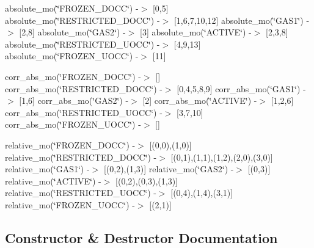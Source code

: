 absolute\+\_\+mo(\char`\"{}\+F\+R\+O\+Z\+E\+N\+\_\+\+D\+O\+C\+C\char`\"{}) -\/$>$ \mbox{[}0,5\mbox{]} absolute\+\_\+mo(\char`\"{}\+R\+E\+S\+T\+R\+I\+C\+T\+E\+D\+\_\+\+D\+O\+C\+C\char`\"{}) -\/$>$ \mbox{[}1,6,7,10,12\mbox{]} absolute\+\_\+mo(\char`\"{}\+G\+A\+S1\char`\"{}) -\/$>$ \mbox{[}2,8\mbox{]} absolute\+\_\+mo(\char`\"{}\+G\+A\+S2\char`\"{}) -\/$>$ \mbox{[}3\mbox{]} absolute\+\_\+mo(\char`\"{}\+A\+C\+T\+I\+V\+E\char`\"{}) -\/$>$ \mbox{[}2,3,8\mbox{]} absolute\+\_\+mo(\char`\"{}\+R\+E\+S\+T\+R\+I\+C\+T\+E\+D\+\_\+\+U\+O\+C\+C\char`\"{}) -\/$>$ \mbox{[}4,9,13\mbox{]} absolute\+\_\+mo(\char`\"{}\+F\+R\+O\+Z\+E\+N\+\_\+\+U\+O\+C\+C\char`\"{}) -\/$>$ \mbox{[}11\mbox{]}

corr\+\_\+abs\+\_\+mo(\char`\"{}\+F\+R\+O\+Z\+E\+N\+\_\+\+D\+O\+C\+C\char`\"{}) -\/$>$ \mbox{[}\mbox{]} corr\+\_\+abs\+\_\+mo(\char`\"{}\+R\+E\+S\+T\+R\+I\+C\+T\+E\+D\+\_\+\+D\+O\+C\+C\char`\"{}) -\/$>$ \mbox{[}0,4,5,8,9\mbox{]} corr\+\_\+abs\+\_\+mo(\char`\"{}\+G\+A\+S1\char`\"{}) -\/$>$ \mbox{[}1,6\mbox{]} corr\+\_\+abs\+\_\+mo(\char`\"{}\+G\+A\+S2\char`\"{}) -\/$>$ \mbox{[}2\mbox{]} corr\+\_\+abs\+\_\+mo(\char`\"{}\+A\+C\+T\+I\+V\+E\char`\"{}) -\/$>$ \mbox{[}1,2,6\mbox{]} corr\+\_\+abs\+\_\+mo(\char`\"{}\+R\+E\+S\+T\+R\+I\+C\+T\+E\+D\+\_\+\+U\+O\+C\+C\char`\"{}) -\/$>$ \mbox{[}3,7,10\mbox{]} corr\+\_\+abs\+\_\+mo(\char`\"{}\+F\+R\+O\+Z\+E\+N\+\_\+\+U\+O\+C\+C\char`\"{}) -\/$>$ \mbox{[}\mbox{]}

relative\+\_\+mo(\char`\"{}\+F\+R\+O\+Z\+E\+N\+\_\+\+D\+O\+C\+C\char`\"{}) -\/$>$ \mbox{[}(0,0),(1,0)\mbox{]} relative\+\_\+mo(\char`\"{}\+R\+E\+S\+T\+R\+I\+C\+T\+E\+D\+\_\+\+D\+O\+C\+C\char`\"{}) -\/$>$ \mbox{[}(0,1),(1,1),(1,2),(2,0),(3,0)\mbox{]} relative\+\_\+mo(\char`\"{}\+G\+A\+S1\char`\"{}) -\/$>$ \mbox{[}(0,2),(1,3)\mbox{]} relative\+\_\+mo(\char`\"{}\+G\+A\+S2\char`\"{}) -\/$>$ \mbox{[}(0,3)\mbox{]} relative\+\_\+mo(\char`\"{}\+A\+C\+T\+I\+V\+E\char`\"{}) -\/$>$ \mbox{[}(0,2),(0,3),(1,3)\mbox{]} relative\+\_\+mo(\char`\"{}\+R\+E\+S\+T\+R\+I\+C\+T\+E\+D\+\_\+\+U\+O\+C\+C\char`\"{}) -\/$>$ \mbox{[}(0,4),(1,4),(3,1)\mbox{]} relative\+\_\+mo(\char`\"{}\+F\+R\+O\+Z\+E\+N\+\_\+\+U\+O\+C\+C\char`\"{}) -\/$>$ \mbox{[}(2,1)\mbox{]} 

\subsection{Constructor \& Destructor Documentation}
\mbox{\label{classforte_1_1_m_o_space_info_ae35cde14c423e8330c03c32863a2a708}} 
